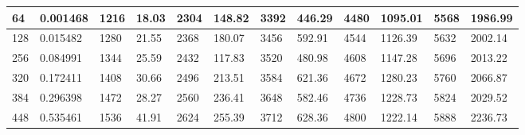 \begin{table}[H]
\begin{center}
{\begin{tabular}{|l|l|l|l|l|l|l|l|l|l|l|l|}
64                                                   & 0.001468 & 1216                                                 & 18.03  & 2304                                                 & 148.82 & 3392                                                 & 446.29 & 4480                                                 & 1095.01 & 5568                                                 & 1986.99 \\ \hline
128                                                  & 0.015482 & 1280                                                 & 21.55  & 2368                                                 & 180.07 & 3456                                                 & 592.91 & 4544                                                 & 1126.39 & 5632                                                 & 2002.14 \\ \hline
256                                                  & 0.084991 & 1344                                                 & 25.59  & 2432                                                 & 117.83 & 3520                                                 & 480.98 & 4608                                                 & 1147.28 & 5696                                                 & 2013.22 \\ \hline
320                                                  & 0.172411 & 1408                                                 & 30.66  & 2496                                                 & 213.51 & 3584                                                 & 621.36 & 4672                                                 & 1280.23 & 5760                                                 & 2066.87 \\ \hline
384                                                  & 0.296398 & 1472                                                 & 28.27  & 2560                                                 & 236.41 & 3648                                                 & 582.46 & 4736                                                 & 1228.73 & 5824                                                 & 2029.52 \\ \hline
448                                                  & 0.535461 & 1536                                                 & 41.91  & 2624                                                 & 255.39 & 3712                                                 & 628.36 & 4800                                                 & 1222.14 & 5888                                                 & 2236.73 \\ \hline

\end{tabular}}
\end{center}
\end{table}
